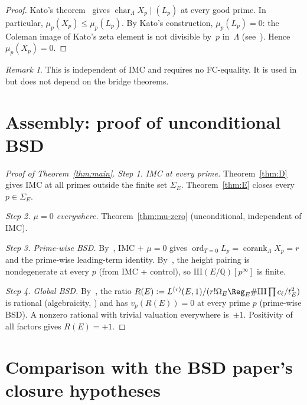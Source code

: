 \documentclass[11pt]{amsart}
\theoremstyle{definition}
\theoremstyle{remark}
\newtheorem{remark}[theorem]{Remark}
\newcommand{\Q}{\mathbb{Q}}
\newcommand{\Lam}{\Lambda}
\DeclareMathOperator{\chr}{char}
\DeclareMathOperator{\corank}{corank}
\DeclareMathOperator{\ord}{ord}
\begin{document}
\begin{proof}
Kato's theorem~\cite{Kato} gives $\chr_\Lam X_p\mid(L_p)$ at every
good prime.  In particular, $\mu_p(X_p)\le\mu_p(L_p)$.  By Kato's
construction, $\mu_p(L_p)=0$: the Coleman image of Kato's zeta
element is not divisible by~$p$ in~$\Lam$
(see~\cite[Theorem~12.4]{Kato}).  Hence $\mu_p(X_p)=0$.
\end{proof}

\begin{remark}
This is independent of IMC and requires no FC-equality.  It is used
in~\cite[Section~7]{BSD} but does not depend on the bridge theorems.
\end{remark}

\section{Assembly: proof of unconditional BSD}\label{sec:assembly}

\begin{proof}[Proof of Theorem~\ref{thm:main}]
\emph{Step 1. IMC at every prime.}
Theorem~\ref{thm:D} gives IMC at all primes outside the finite set
$\Sigma_E$.  Theorem~\ref{thm:E} closes every $p\in\Sigma_E$.

\emph{Step 2. $\mu=0$ everywhere.}
Theorem~\ref{thm:mu-zero} (unconditional, independent of IMC).

\emph{Step 3. Prime-wise BSD.}
By~\cite[Proposition~4.1]{BSD}, IMC $+$ $\mu=0$ gives
$\ord_{T=0}L_p=\corank_\Lam X_p=r$ and the prime-wise leading-term
identity.  By~\cite[Proposition~4.4]{BSD}, the height pairing is
nondegenerate at every $p$ (from IMC + control), so
$\mathrm{III}(E/\Q)[p^\infty]$ is finite.

\emph{Step 4. Global BSD.}
By~\cite[Theorem~7.3]{BSD}, the ratio
$R(E):=L^{(r)}(E,1)/(r!\Omega_E\Reg_E\#\mathrm{III}\prod c_\ell/t_E^2)$
is rational (algebraicity, \cite{Shimura77,Deligne79}) and has
$v_p(R(E))=0$ at every prime $p$ (prime-wise BSD).  A nonzero rational
with trivial valuation everywhere is~$\pm 1$.  Positivity of all
factors gives $R(E)=+1$.
\end{proof}

\section{Comparison with the BSD paper's closure hypotheses}
\label{sec:comparison}
\end{document}
